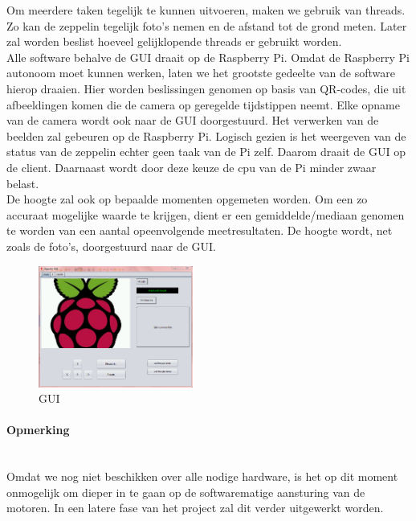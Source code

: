 \documentclass{peno-opdracht2}
\begin{document}
Om meerdere taken tegelijk te kunnen uitvoeren, maken we gebruik van threads. Zo kan de zeppelin tegelijk foto's nemen en de afstand tot de grond meten. Later zal worden beslist hoeveel gelijklopende threads er gebruikt worden. \\

Alle software behalve de GUI draait op de Raspberry Pi. Omdat de Raspberry Pi autonoom moet kunnen werken, laten we het grootste gedeelte van de software hierop draaien. Hier worden beslissingen genomen op basis van QR-codes, die uit afbeeldingen komen die de camera op geregelde tijdstippen neemt. Elke opname van de camera wordt ook naar de GUI doorgestuurd. Het verwerken van de beelden zal gebeuren op de Raspberry Pi. Logisch gezien is het weergeven van de status van de zeppelin echter geen taak van de Pi zelf. Daarom draait de GUI op de client. Daarnaast wordt door deze keuze de cpu van de Pi minder zwaar belast. \\

De hoogte zal ook op bepaalde momenten opgemeten worden. Om een zo accuraat mogelijke waarde te krijgen, dient er een gemiddelde/mediaan genomen te worden van een aantal opeenvolgende meetresultaten. De hoogte wordt, net zoals de foto's, doorgestuurd naar de GUI.

\begin{figure}[ht!]
\centering
\includegraphics[height=40mm]{GUI.png}
\caption{GUI}
\label{GUI}
\end{figure}


\paragraph{Opmerking} ~\\
Omdat we nog niet beschikken over alle nodige hardware, is het op dit moment onmogelijk om dieper in te gaan op de softwarematige aansturing van de motoren. In een latere fase van het project zal dit verder uitgewerkt worden.
\end{document}
